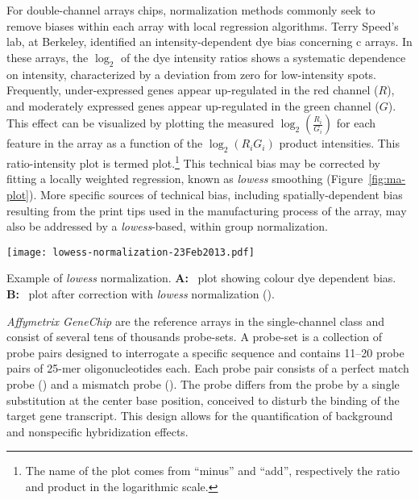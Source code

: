 For double-channel arrays chips, normalization methods commonly seek to remove
biases within each array with local regression algorithms.  Terry Speed's lab,
at Berkeley, identified an intensity-dependent dye bias concerning
c arrays.  In these arrays, the $\log_2$ of the dye intensity
ratios shows a systematic dependence on intensity, characterized by a deviation
from zero for low-intensity spots.  Frequently, under-expressed genes appear
up-regulated in the red channel ($R$), and moderately expressed genes appear
up-regulated in the green channel ($G$).
This effect can be visualized by plotting the measured
$\log_2(\frac{R_{i}}{G_{i}})$ for each feature in the array as a function of the
$\log_2(R_{i}G_{i})$ product intensities.  This ratio-intensity plot is termed
 plot.\footnote[][-5.5cm]{The name of the plot comes from
  ``minus'' and ``add'', respectively the ratio and product in the logarithmic
  scale.}  This technical bias may be corrected by fitting a locally weighted
regression, known as \emph{lowess} smoothing
(Figure~\ref{fig:ma-plot}).\cite[-4.2cm]{yang_normalization_2001} More specific
sources of technical bias, including spatially-dependent bias resulting from the
print tips used in the manufacturing process of the array, may also be addressed
by a \emph{lowess}-based, within group normalization.

\begin{marginfigure}[-4.2cm]%
  \begin{center}
    \texttt{[image: lowess-normalization-23Feb2013.pdf]}
    \caption[\emph{Lowess} normalization]{Example of \emph{lowess}
      normalization.  \textbf{A:}~ plot showing colour dye
      dependent bias.  \textbf{B:}~ plot after correction with
      \emph{lowess} normalization
      (\citealp{yang_normalization_2002}).}\label{fig:ma-plot}%
  \end{center}
\end{marginfigure}

\emph{Affymetrix GeneChip} are the reference arrays in the single-channel class
and consist of several tens of thousands probe-sets.  A probe-set is a
collection of probe pairs designed to interrogate a specific sequence and
contains \numrange{11}{20} probe pairs of 25-mer oligonucleotides each.  Each
probe pair consists of a perfect match probe () and a mismatch
probe ().  The  probe differs from the
 probe by a single substitution at the center base position,
conceived to disturb the binding of the target gene transcript.  This design
allows for the quantification of background and nonspecific hybridization
effects.

